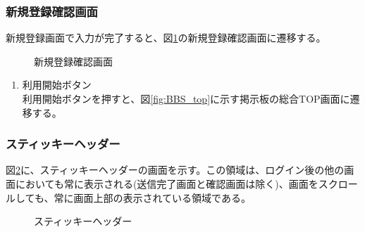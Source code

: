 \documentclass[a4j]{jarticle}
\begin{document}
\subsubsection{新規登録確認画面}
新規登録画面で入力が完了すると、図\ref{fig:subscribe_ok}の新規登録確認画面に遷移する。
\begin{figure}[H]
\centering
{}
\caption{新規登録確認画面}
\label{fig:subscribe_ok}
\end{figure}

\begin{enumerate}
  \renewcommand{\labelenumi}{\textcircled{\scriptsize \theenumi}}
  \item 利用開始ボタン\\
  利用開始ボタンを押すと、図\ref{fig:BBS_top}に示す掲示板の総合TOP画面に遷移する。
\end{enumerate}

\subsubsection{スティッキーヘッダー}
図\ref{fig:header}に、スティッキーヘッダーの画面を示す。この領域は、ログイン後の他の画面においても常に表示される(送信完了画面と確認画面は除く)、画面をスクロールしても、常に画面上部の表示されている領域である。

\begin{figure}[H]
\centering
{}
\caption{スティッキーヘッダー}
\label{fig:header}
\end{figure}
\end{document}
